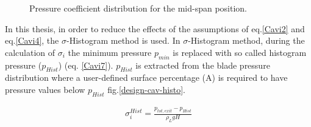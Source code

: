 \begin{figure}[h!]
\begin{minipage}[b]{1\linewidth}
 \centering
\end{minipage}
\caption{Pressure coefficient distribution for the mid-span position.}
\label{design-cav-cp}
\end{figure}

In this thesis, in order to reduce the effects of the assumptions of eq.\ref{Cavi2} and eq.\ref{Cavi4}, the $\sigma$-Histogram method \cite{Schmidl} is used. In $\sigma$-Histogram method, during the calculation of $\sigma_i$ the minimum pressure $p_{min}$ is replaced with so called histogram pressure ($p_{Hist}$) (eq. \ref{Cavi7}). $p_{Hist}$ is extracted from the blade pressure distribution where a user-defined surface percentage (A) is required to have pressure values below $p_{Hist}$ fig.\ref{design-cav-histo}.  

\begin{eqnarray}
		\sigma_i^{Hist}=\frac{p_{tot,exit}-p_{Hist}}{\rho_{L}gH}
\label{Cavi7}
\end{eqnarray}



